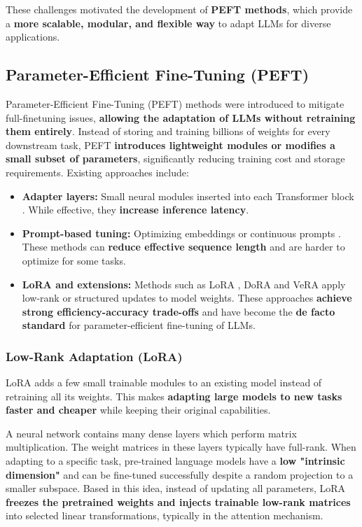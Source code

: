 \documentclass[11pt,a4paper]{article}
\begin{document}
These challenges motivated the development of \textbf{PEFT methods}, which provide a \textbf{more scalable, modular, and flexible way} to adapt LLMs for diverse applications.

\subsection{Parameter-Efficient Fine-Tuning (PEFT)}
Parameter-Efficient Fine-Tuning (PEFT) methods were introduced to mitigate full-finetuning issues, \textbf{allowing the adaptation of LLMs without retraining them entirely}.
Instead of storing and training billions of weights for every downstream task, PEFT \textbf{introduces lightweight modules or modifies a small subset of parameters}, significantly reducing training cost and storage requirements.
Existing approaches include:
\begin{itemize}[leftmargin=1.5em]
    \item \textbf{Adapter layers:} Small neural modules inserted into each Transformer block \cite{houlsby2019parameter}. While effective, they \textbf{increase inference latency}.
    \item \textbf{Prompt-based tuning:} Optimizing embeddings or continuous prompts \cite{li2021prefix}. These methods can \textbf{reduce effective sequence length} and are harder to optimize for some tasks.
    \item \textbf{LoRA and extensions:} Methods such as LoRA \cite{hu2021LoRA}, DoRA \cite{liu2024dora} and VeRA \cite{kopiczko2024vera} apply low-rank or structured updates to model weights. These approaches \textbf{achieve strong efficiency-accuracy trade-offs} and have become the \textbf{de facto standard} for parameter-efficient fine-tuning of LLMs.

\end{itemize}

\subsubsection{Low-Rank Adaptation (LoRA)}
LoRA adds a few small trainable modules to an existing model instead of retraining all its weights.
This makes \textbf{adapting large models to new tasks faster and cheaper} while keeping their original capabilities.

A neural network contains many dense layers which perform matrix multiplication. The weight
matrices in these layers typically have full-rank. When adapting to a specific task, pre-trained language models have a \textbf{low "intrinsic dimension"}\cite{dimension} and can be fine-tuned successfully despite a random projection to a smaller subspace. 
Based in this idea, instead of updating all parameters, LoRA \textbf{freezes the pretrained weights and injects trainable low-rank matrices} into selected linear transformations, typically in the attention mechanism.
\end{document}
